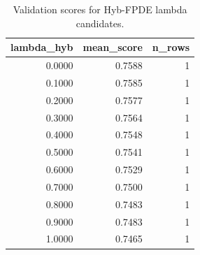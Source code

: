 \begin{table}[t]
\caption{Validation scores for Hyb-FPDE lambda candidates.}
\label{tab:lambda_distribution_computed}
\centering
\begin{tabular}{rrr}
\toprule
lambda\_hyb & mean\_score & n\_rows \\
\midrule
0.0000 & 0.7588 & 1 \\
0.1000 & 0.7585 & 1 \\
0.2000 & 0.7577 & 1 \\
0.3000 & 0.7564 & 1 \\
0.4000 & 0.7548 & 1 \\
0.5000 & 0.7541 & 1 \\
0.6000 & 0.7529 & 1 \\
0.7000 & 0.7500 & 1 \\
0.8000 & 0.7483 & 1 \\
0.9000 & 0.7483 & 1 \\
1.0000 & 0.7465 & 1 \\
\bottomrule
\end{tabular}

\end{table}
